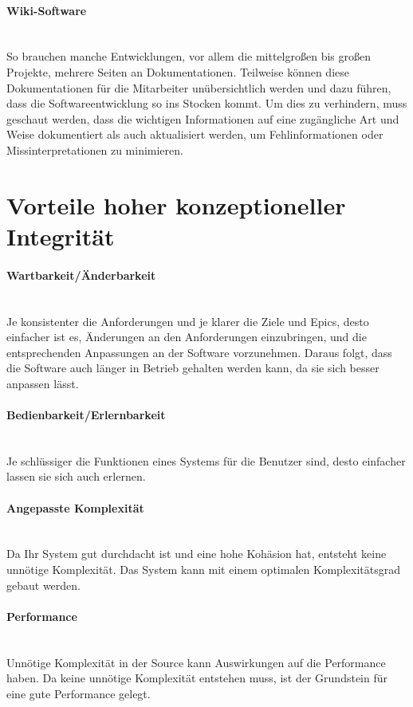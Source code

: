 \documentclass[a4paper, ngerman, 12pt, usenames, dvipsnames]{article}
\begin{document}
\paragraph{Wiki-Software}\mbox{} \\
So brauchen manche Entwicklungen, vor allem die mittelgroßen bis großen Projekte, mehrere Seiten an Dokumentationen. Teilweise können diese Dokumentationen für die Mitarbeiter unübersichtlich werden und dazu führen, dass die Softwareentwicklung so ins Stocken kommt. Um dies zu verhindern, muss geschaut werden, dass die wichtigen Informationen auf eine zugängliche Art und Weise dokumentiert als auch aktualisiert werden, um Fehlinformationen oder Missinterpretationen zu minimieren.


\section{Vorteile hoher konzeptioneller Integrität}
\paragraph{Wartbarkeit/Änderbarkeit}\mbox{} \\
Je konsistenter die Anforderungen und je klarer die Ziele und Epics, desto einfacher ist es, Änderungen an den Anforderungen einzubringen, und die entsprechenden Anpassungen an der Software vorzunehmen. Daraus folgt, dass die Software auch länger in Betrieb gehalten werden kann, da sie sich besser anpassen lässt.
\paragraph{Bedienbarkeit/Erlernbarkeit}\mbox{} \\
Je schlüssiger die Funktionen eines Systems für die Benutzer sind, desto einfacher lassen sie sich auch erlernen.
\paragraph{Angepasste Komplexität}\mbox{} \\
Da Ihr System gut durchdacht ist und eine hohe Kohäsion hat, entsteht keine unnötige Komplexität. Das System kann mit einem optimalen Komplexitätsgrad gebaut werden.
\paragraph{Performance}\mbox{} \\
Unnötige Komplexität in der Source kann Auswirkungen auf die Performance haben. Da keine unnötige Komplexität entstehen muss, ist der Grundstein für eine gute Performance gelegt.
\end{document}
